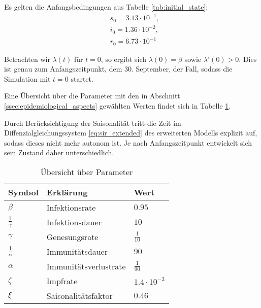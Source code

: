 \documentclass[../main.tex]{subfiles}
\begin{document}
    Es gelten die Anfangsbedingungen aus Tabelle \ref{tab:initial_state}:
    \begin{equation*}
        \begin{aligned}
        &s_0 = 3.13 \cdot 10^{-1}, \\
        &i_0 = 1.36 \cdot 10^{-2}, \\
        &r_0 = 6.73 \cdot 10^{-1}
        \end{aligned}
    \end{equation*}

    Betrachten wir $\lambda(t)$ für $t=0$, so ergibt sich $\lambda(0) = \beta$  sowie  $\lambda'(0)>0$. Dies ist genau zum Anfangszeitpunkt, dem 30. September, der Fall, sodass die Simulation mit $t=0$ startet.
    
    Eine Übersicht über die Parameter mit den in Abschnitt \ref{ssec:epidemiological_aspects} gewählten Werten findet sich in Tabelle \ref{tab:parameters}.

    Durch Berücksichtigung der Saisonalität tritt die Zeit im Diffenzialgleichungssystem \eqref{eq:sir_extended} des erweiterten Modells explizit auf, sodass dieses nicht mehr autonom ist. Je nach Anfangszeitpunkt entwickelt sich sein Zustand daher unterschiedlich.

    \begin{table}[h]
        \centering
        \begin{tabularx}{\textwidth}{X | p{} | X}
            \textbf{Symbol}     & \textbf{Erklärung}    & \textbf{Wert}         \\ \hline
            $\beta$             & Infektionsrate        & $0.95$                \\ \hline
            $\frac{1}{\gamma}$  & Infektionsdauer       & $10$                  \\
            $\gamma$            & Genesungsrate         & $\frac{1}{10}$        \\ \hline
            $\frac{1}{\alpha}$  & Immunitätsdauer       & $90$                  \\
            $\alpha$            & Immunitätsverlustrate & $\frac{1}{90}$        \\ \hline
            $\zeta$             & Impfrate              & $1.4 \cdot 10^{-3}$   \\ \hline
            $\xi$               & Saisonalitätsfaktor   & $0.46$
        \end{tabularx}
        \caption{Übersicht über Parameter}
        \label{tab:parameters}
    \end{table}
\end{document}

